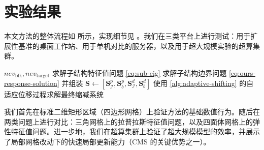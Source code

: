 \section{实验结果}
\label{sec:results}

本文方法的整体流程如  所示，实现细节见 。我们在三类平台上进行测试：用于扩展性基准的桌面工作站、用于单机对比的服务器，以及用于超大规模实验的超算集群。

\begin{algorithm}[H]
  \caption{多重划分 CMS}
  \label{alg:pd-cms}
  \begin{algorithmic}[1]
    \REQUIRE $nev_{\text{blk}},nev_{\text{target}}$
    \STATE {}
      \STATE 求解子结构特征值问题 \cref{eq:sub-eig}
    \ENDFOR
    \STATE {}
      \STATE 求解子结构边界问题 \cref{eq:ours-response-solution} 并组装
    \ENDFOR
    \STATE $\mathbf{S} \leftarrow [\mathbf{S}^p_\mathcal{I},\mathbf{S}^p_b,\mathbf{S}_{\mathcal{I}}^d,\mathbf{S}_{b}^d]$
    \STATE 使用 \cref{alg:adaptive-shifting} 的自适应位移过程求解最终缩减系统
  \end{algorithmic}
\end{algorithm}

我们首先在标准二维矩形区域（四边形网格）上验证方法的基础数值行为。随后在两类问题上进行对比：三角网格上的拉普拉斯特征值问题，以及四面体网格上的弹性特征值问题。进一步地，我们在超算集群上验证了超大规模模型的效率，并展示了局部网格改动下的快速局部更新能力（CMS 的关键优势之一）。

